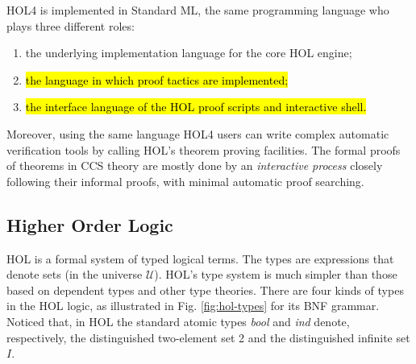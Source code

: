 HOL4 is implemented in Standard ML, the same programming language who
plays three different roles:
\begin{enumerate}
\item the underlying implementation language for the core HOL engine;
\item \hl{the language in which proof tactics are implemented;}
\item \hl{the interface  language of the HOL proof scripts and
  interactive shell.}
\end{enumerate}
Moreover, using the same language HOL4 users can write complex automatic
verification tools by calling HOL's theorem proving
facilities. The formal proofs of theorems in CCS theory
are mostly done by an \emph{interactive process} closely following
their informal proofs, with minimal automatic proof searching.

\subsection{Higher Order Logic}

HOL is a formal system of typed logical terms. The types are expressions that denote sets (in the
universe $\mathcal{U}$). HOL's type system is much simpler than those
based on dependent types and other type theories. There are four kinds of types in the HOL
logic, as illustrated in Fig. \ref{fig:hol-types} for its BNF
grammar. Noticed that, in HOL the standard atomic types \emph{bool} and \emph{ind}
 denote, respectively, the distinguished two-element set 2 and the
distinguished infinite set $I$.

\newlength{\ttX}
\settowidth{\ttX}{\tt X}
\newcommand{\tyvar}{\setlength{\unitlength}{\ttX}\begin{picture}(1,6)
\put(.5,0){\makebox(0,0)[b]{\footnotesize type variables}}
\put(0,1.5){\vector(0,1){4.5}}
\end{picture}}
\newcommand{\tyatom}{\setlength{\unitlength}{\ttX}\begin{picture}(1,6)
\put(.5,2.3){\makebox(0,0)[b]{\footnotesize atomic types}}
\put(.5,3.3){\vector(0,1){2.6}}
\end{picture}}
\newcommand{\funty}{\setlength{\unitlength}{\ttX}\begin{picture}(1,6)
\put(.5,1.5){\makebox(0,0)[b]{\footnotesize function types}}
\put(.5,0){\makebox(0,0)[b]{\footnotesize (domain $\sigma_1$, codomain $\sigma_2$)}}
\put(1,2.5){\vector(0,1){3.5}}
\end{picture}}
\newcommand{\cmpty}{\setlength{\unitlength}{\ttX}\begin{picture}(1,6)
\put(2,3.3){\makebox(0,0)[b]{\footnotesize compound types}}
\put(1.9,4.5){\vector(0,1){1.5}}
\end{picture}}

